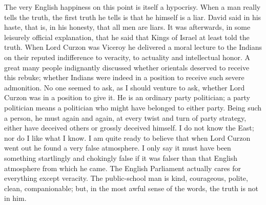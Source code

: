 \documentclass{book}
\begin{document}
The very English happiness on this point is itself a hypocrisy. When a man really tells the truth, the first truth he tells is that he himself is a liar. David said in his haste, that is, in his honesty, that all men are liars. It was afterwards, in some leisurely official explanation, that he said that Kings of Israel at least told the truth. When Lord Curzon was Viceroy he delivered a moral lecture to the Indians on their reputed indifference to veracity, to actuality and intellectual honor. A great many people indignantly discussed whether orientals deserved to receive this rebuke; whether Indians were indeed in a position to receive such severe admonition. No one seemed to ask, as I should venture to ask, whether Lord Curzon was in a position to give it. He is an ordinary party politician; a party politician means a politician who might have belonged to either party. Being such a person, he must again and again, at every twist and turn of party strategy, either have deceived others or grossly deceived himself. I do not know the East; nor do I like what I know. I am quite ready to believe that when Lord Curzon went out he found a very false atmosphere. I only say it must have been something startlingly and chokingly false if it was falser than that English atmosphere from which he came. The English Parliament actually cares for everything except veracity. The public-school man is kind, courageous, polite, clean, companionable; but, in the most awful sense of the words, the truth is not in him.
\end{document}
